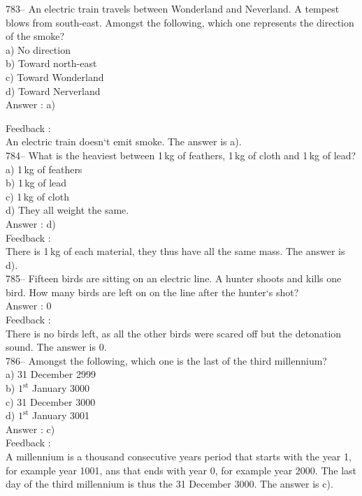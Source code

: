 \documentclass[letterpaper, 12pt]{article}
\begin{document}
783-- An electric train travels between Wonderland and Neverland. A tempest blows from south-east. Amongst the following, which one represents the direction of the smoke?\\
a) No direction\\
b) Toward north-east\\
c) Toward Wonderland\\
d) Toward Nerverland\\

Answer : a)

Feedback : \\
An electric train doesn`t emit smoke. The answer is a).\\

784-- What is the heaviest between 1\,kg of feathers, 1\,kg of cloth and 1\,kg of lead?\\
a) 1\,kg of feathers\\
b) 1\,kg of lead\\
c) 1\,kg of cloth\\
d) They all weight the same.\\

Answer : d)\\

Feedback : \\
There is 1\,kg of each material, they thus have all the same mass.  The answer is d).\\

785-- Fifteen birds are sitting on an electric line. A hunter shoots and kills one bird. How many birds are left on on the line after the hunter`s shot?\\

Answer : 0\\

Feedback : \\
There is no birds left, as all the other birds were scared off but the detonation sound. The answer is 0. \\

786-- Amongst the following, which one is the last of the third millennium?\\
a) 31 December 2999\\
b) $1^{\textrm{st}}$ January 3000\\
c) 31 December 3000\\
d) $1^{\textrm{st}}$ January 3001\\

Answer : c)\\

Feedback : \\
A millennium is a thousand consecutive years period that starts with the year 1, for example year 1001, ans that ends with year 0, for example year 2000. The last day of the third millennium is thus the 31 December 3000. The answer is c).\\
\end{document}
